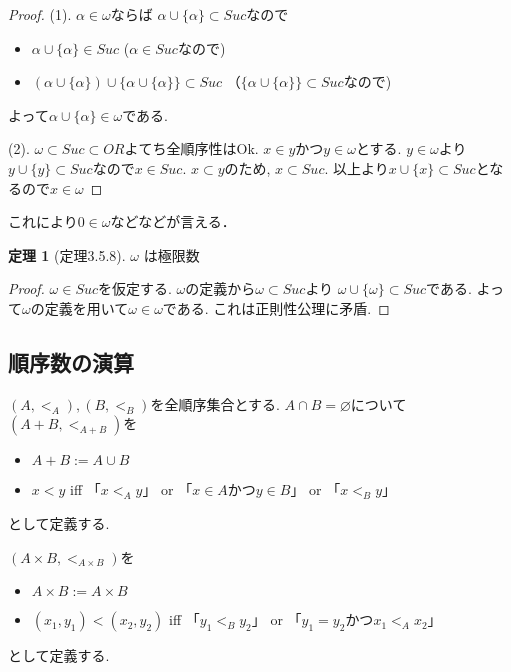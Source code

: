 \documentclass[dvipdfmx,a4paper,11pt]{report}
\theoremstyle{definition}
\newtheorem{thm}{定理}
\begin{document}
\begin{proof}
(1). $\alpha \in \omega$ならば
$\alpha  \cup \{ \alpha \} \subset Suc $なので
\begin{itemize}
\item $\alpha  \cup \{ \alpha \}  \in Suc $ ($\alpha \in Suc$なので)
\item $(\alpha  \cup \{ \alpha \} ) \cup \{ \alpha  \cup \{ \alpha \} \}  \subset Suc $ （$\{ \alpha  \cup \{ \alpha \} \} \subset Suc$なので)
\end{itemize}
よって$\alpha  \cup \{ \alpha \}  \in \omega$である. 

(2). $\omega \subset Suc \subset OR$よてち全順序性はOk.
$x \in y$かつ$y \in \omega$とする. 
$y \in \omega$より$y \cup \{ y\}\subset Suc$なので$x \in Suc$.
$x \subset y$のため, $x \subset Suc$.
以上より$x \cup \{ x\} \subset Suc$となるので$x \in \omega $
\end{proof}

これにより$0 \in \omega$などなどが言える． 

 \begin{tcolorbox}
 [colback = white, colframe = green!35!black, fonttitle = \bfseries,breakable = true]
\begin{thm}[定理3.5.8]
$\omega$ は極限数
\end{thm}
\end{tcolorbox}
\begin{proof}
$\omega \in Suc$を仮定する. 
$\omega$の定義から$\omega \subset Suc$より
$\omega \cup \{ \omega\} \subset Suc$である.
よって$\omega$の定義を用いて$\omega \in \omega$である.
これは正則性公理に矛盾. 
\end{proof}

\subsection{順序数の演算}

 \begin{tcolorbox}
 [colback = white, colframe = green!35!black, fonttitle = \bfseries,breakable = true]
$(A,<_A), (B,<_B)$を全順序集合とする.
$A \cap B=\varnothing$について
$(A+B,<_{A+B})$を
\begin{itemize}
\item $A + B := A \cup B$
\item $x < y$ iff 「$x<_A y$」 or 「$x \in A$かつ$y \in B$」 or 「$x<_B y$」
\end{itemize}
として定義する.


$(A \times B,<_{A \times B})$を
\begin{itemize}
\item $A  \times B := A \times  B$
\item $(x_1, y_1) < (x_2, y_2)$ iff 
「$y_1<_B y_2$」 or 「$y_1 = y_2$かつ$x_1<_A x_2$」
\end{itemize}
として定義する.
\end{tcolorbox}
\end{document}
